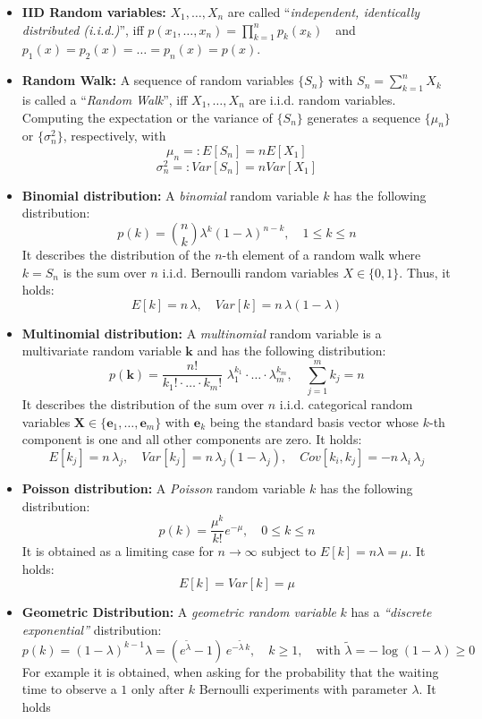 \documentclass[11pt]{article}
\begin{document}
\begin{itemize}
\begin{itemize}
\end{itemize} 
\item {\bf IID Random variables:} $X_1, \dots, X_n$ are called ``{\it independent, identically distributed (i.i.d.)}'', iff $p(x_1, \dots, x_n)=\prod_{k=1}^n p_k(x_k)$  \,\, and \,\, $p_1(x)=p_2(x)=\dots = p_n(x)= p(x)$.
\item {\bf Random Walk:} A sequence of random variables $\{S_n\}$ with $S_n=\sum_{k=1}^n X_k$ is called a ``{\it Random Walk}'', iff $X_1, \dots, X_n$ are 
i.i.d. random variables. Computing the expectation or the variance of $\{S_n\}$ generates a sequence $\{\mu_n\}$ or $\{\sigma^2_n\}$, respectively, with
$$
\mu_n=:E[S_n]=nE[X_1]
$$ 
$$
\sigma^2_n=:Var[S_n]=nVar[X_1]
$$ 
\item {\bf Binomial distribution:} A {\it binomial} random variable $k$ has the following distribution:
$$
p(k) = {n \choose k} \lambda^k (1-\lambda)^{n-k}, \quad 1\le k \le n 
$$
It describes the distribution of the $n$-th element of a random walk where $k=S_n$ is the sum over $n$ i.i.d. Bernoulli random variables $X \in \{0,1\}$. Thus, it holds:
$$
E[k] = n\, \lambda, \quad Var[k]= n \, \lambda (1-\lambda)
$$
\item {\bf Multinomial distribution:} A {\it multinomial} random variable is a multivariate random variable $\mathbf{k}$ and has the following distribution:
$$
p(\mathbf{k}) = \frac{n!}{k_1! \cdot \dots \cdot k_m!} \,\, \lambda_1^{k_1} \cdot \dots \cdot \lambda_m^{k_m}, \quad \sum_{j=1}^m k_j = n 
$$
It describes the distribution of the sum over $n$ i.i.d. categorical random variables $\mathbf{X} \in \{\mathbf{e}_1, \dots, \mathbf{e}_m\}$ with $\mathbf{e}_k$ being the standard basis vector whose $k$-th component is one and all other components are zero. It holds:
$$
E[k_j] = n\, \lambda_j, \quad Var[k_j]= n \, \lambda_j (1-\lambda_j), \quad Cov[k_i, k_j]= -n \, \lambda_i \,\lambda_j 
$$
\item {\bf Poisson distribution:} A {\it Poisson} random variable $k$ has the following distribution:
$$
p(k) = \frac{\mu^k}{k!} e^{-\mu}, \quad 0\le k \le n
$$
It is obtained as a limiting case for $n \to \infty$ subject to $E[k]=n\lambda=\mu$. It holds:
$$
E[k] = Var[k]= \mu
$$
\item {\bf Geometric Distribution:} A {\it geometric random variable} $k$ has a {\it ``discrete exponential''} distribution:
$$
p(k) = (1-\lambda)^{k-1} \lambda = (e^{\tilde \lambda}-1) \, e^{-\tilde \lambda \, k}, \quad  k \ge 1, \quad \mbox{with } \tilde \lambda = -\log(1-\lambda) \ge 0
$$
For example it is obtained, when asking for the probability that the waiting time to observe a $1$ only after $k$ Bernoulli experiments with parameter $\lambda$. It holds

\end{itemize}
\end{document}
